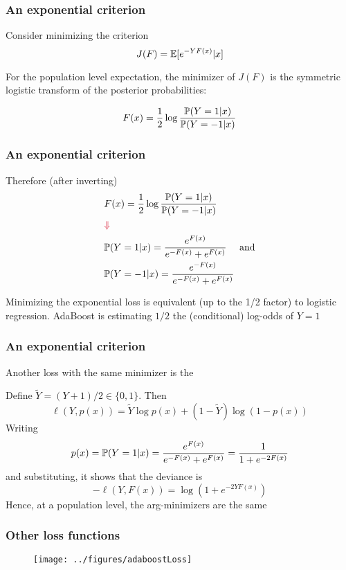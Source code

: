 \documentclass[12pt]{beamer}
\begin{document}
\begin{frame}[fragile]
\frametitle{An exponential criterion}
Consider minimizing the criterion
\[
J(F) = \E[e^{-YF(x)}|x]
\]
\vsp

For the population level expectation, the minimizer of $J(F)$ is the symmetric logistic transform of the posterior probabilities:

\[
F(x) = \frac{1}{2} \log \frac{\P(Y = 1 | x)}{\P(Y = -1 | x)}
\]
\end{frame}

\begin{frame}[fragile]
\frametitle{An exponential criterion}
Therefore (after inverting)
\begin{align*}
& F(x) = \frac{1}{2} \log \frac{\P(Y = 1 | x)}{\P(Y = -1 | x)}  \\
&\alr{\Downarrow }\\
& \P(Y = 1 | x) = \frac{e^{F(x)}}{e^{-F(x)}+ e^{F(x)}} \quad \textrm{ and}\\
& \P(Y = -1 | x) = \frac{e^{-F(x)}}{e^{-F(x)}+ e^{F(x)}} 
\end{align*}
\vsp

 Minimizing the exponential loss is equivalent (up to the 1/2 factor) to logistic regression.
AdaBoost is estimating $1/2$ the (conditional) log-odds of $Y = 1$

\end{frame}

\begin{frame}[fragile]
\frametitle{An exponential criterion}
Another loss with the same  minimizer is the 

\vsp
Define $\tilde{Y} = (Y+1)/2 \in \{0,1\}$.  Then 
\[
\ell(Y,p(x)) = \tilde{Y} \log p(x) + (1- \tilde{Y}) \log(1-p(x))
\]
Writing 
\[
p(x) = \P(Y = 1 | x) = \frac{e^{F(x)}}{e^{-F(x)}+ e^{F(x)}}  = \frac{1}{1+ e^{-2F(x)}} 
\]
and substituting, it shows that the deviance is
\[
-\ell(Y,F(x)) = \log(1 + e^{-2YF(x)})
\]
Hence, at a population level, the arg-minimizers are the same
\end{frame}

\begin{frame}[fragile]
\frametitle{Other loss functions}
\begin{figure}
\centering
\texttt{[image: ../figures/adaboostLoss]}
\end{figure}
\end{frame}
\end{document}
